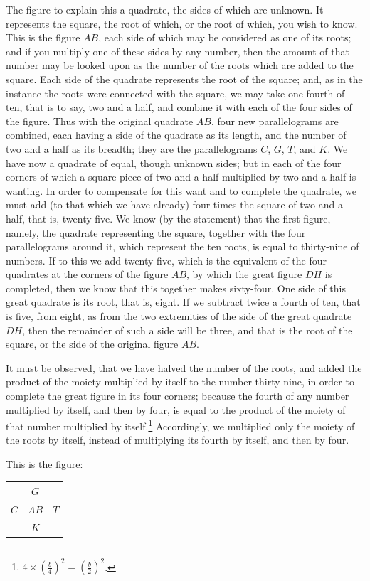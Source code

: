 The figure to explain this a quadrate, the sides of which are unknown. It represents the square, the root of which, or the root of which, you wish to know. This is the figure $AB$, each side of which may be considered as one of its roots; and if you multiply one of these sides by any number, then the amount of that number may be looked upon as the number of the roots which are added to the square. Each side of the quadrate represents the root of the square; and, as in the instance the roots were connected with the square, we may take one-fourth of ten, that is to say, two and a half, and combine it with each of the four sides of the figure. Thus with the original quadrate $AB$, four new parallelograms are combined, each having a side of the quadrate as its length, and the number of two and a half as its breadth; they are the parallelograms $C$, $G$, $T$, and $K$. We have now a quadrate of equal, though unknown sides; but in each of the four corners of which a square piece of two and a half multiplied by two and a half is wanting. In order to compensate for this want and to complete the quadrate, we must add (to that which we have already) four times the square of two and a half, that is, twenty-five. We know (by the statement) that the first figure, namely, the quadrate representing the square, together with the four parallelograms around it, which represent the ten roots, is equal to thirty-nine of numbers. If to this we add twenty-five, which is the equivalent of the four quadrates at the corners of the figure $AB$, by which the great figure $DH$ is completed, then we know that this together makes sixty-four. One side of this great quadrate is its root, that is, eight. If we subtract twice a fourth of ten, that is five, from eight, as from the two extremities of the side of the great quadrate $DH$, then the remainder of such a side will be three, and that is the root of the square, or the side of the original figure $AB$.

It must be observed, that we have halved the number of the roots, and added the product of the moiety multiplied by itself to the number thirty-nine, in order to complete the great figure in its four corners; because the fourth of any number multiplied by itself, and then by four, is equal to the product of the moiety of that number multiplied by itself.\footnote{$4 \times (\frac{b}{4})^2 = (\frac{b}{2})^2$.} Accordingly, we multiplied only the moiety of the roots by itself, instead of multiplying its fourth by itself, and then by four.

This is the figure:
\begin{center}
\begin{tabular}{c|c|c}
\hline
  & $G$ & \\
\hline
$C$ & $AB$ & $T$ \\
\hline
  & $K$ & \\
\hline
\end{tabular}
\end{center}

